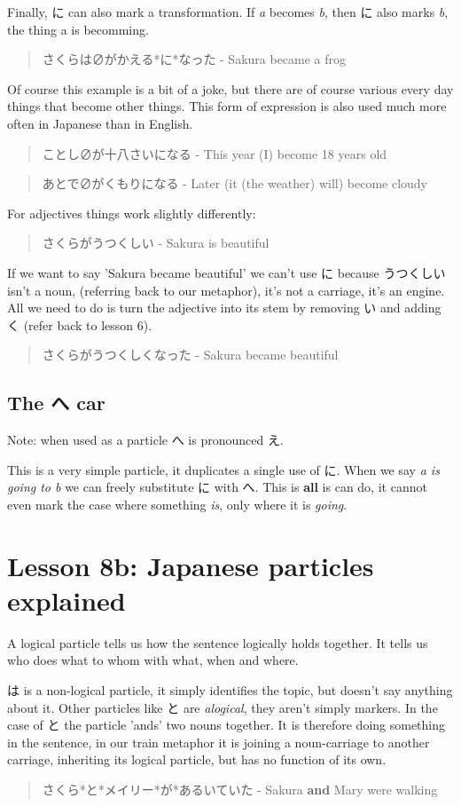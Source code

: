 \documentclass[11pt]{article}
\begin{document}
Finally, に can also mark a transformation. If \emph{a} becomes \emph{b}, then に also marks \emph{b}, the thing a is becomming.
\begin{quote}
さくらは∅がかえる*に*なった - Sakura became a frog
\end{quote}
Of course this example is a bit of a joke, but there are of course various every day things that become other things. This form of expression is also used much more often in Japanese than in English.
\begin{quote}
ことし∅が十八さいになる - This year (I) become 18 years old
\end{quote}
\begin{quote}
あとで∅がくもりになる - Later (it (the weather) will) become cloudy
\end{quote}

For adjectives things work slightly differently:
\begin{quote}
さくらがうつくしい - Sakura is beautiful
\end{quote}
If we want to say 'Sakura became beautiful' we can't use に because うつくしい isn't a noun, (referring back to our metaphor), it's not a carriage, it's an engine. All we need to do is turn the adjective into its stem by removing い and adding く (refer back to lesson 6).

\begin{quote}
さくらがうつくしくなった - Sakura became beautiful
\end{quote}

\subsection{The へ car}
\label{sec:orgf4233d4}
Note: when used as a particle へ is pronounced え.

This is a very simple particle, it duplicates a single use of に. When we say \emph{a is going to b} we can freely substitute に with へ. This is \textbf{all} is can do, it cannot even mark the case where something \emph{is}, only where it is \emph{going}.
\section{Lesson 8b: Japanese particles explained}
\label{sec:org85e10a9}
A logical particle tells us how the sentence logically holds together. It tells us who does what to whom with what, when and where.

は is a non-logical particle, it simply identifies the topic, but doesn't say anything about it. Other particles like と are \emph{alogical}, they aren't simply markers. In the case of と the particle 'ands' two nouns together. It is therefore doing something in the sentence, in our train metaphor it is joining a noun-carriage to another carriage, inheriting its logical particle, but has no function of its own.
\begin{quote}
さくら*と*メイリー*が*あるいていた - Sakura \textbf{and} Mary were walking
\end{quote}
\end{document}
